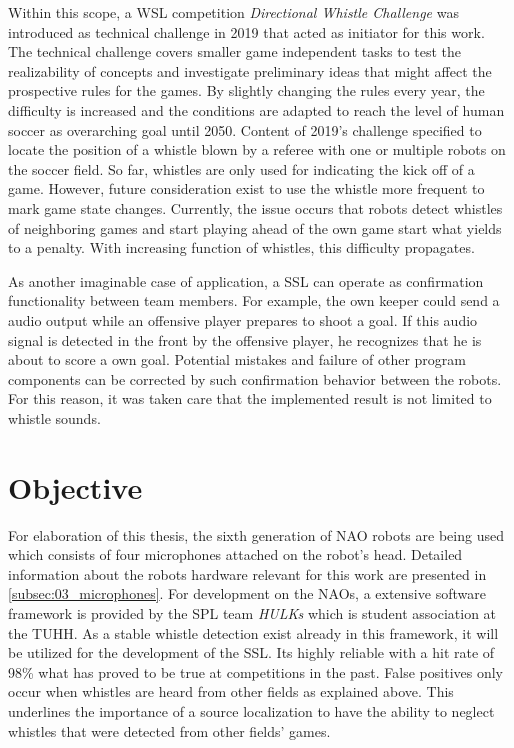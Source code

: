 Within this scope, a \acf{WSL} competition \textit{Directional Whistle Challenge} was
introduced as technical challenge in 2019 that acted as initiator for this work.
The technical challenge covers smaller game independent tasks to test the realizability of
concepts and investigate preliminary ideas that might affect the prospective rules for the games.
By slightly changing the rules every year, the difficulty is increased and the conditions
are adapted to reach the level of human soccer as overarching goal until 2050.
Content of 2019's challenge specified to locate the position of a whistle blown by a referee
with one or multiple robots on the soccer field.
So far, whistles are only used for indicating the kick off of a game.
However, future consideration exist to use the whistle more frequent
to mark game state changes.
Currently, the issue occurs that robots detect whistles of neighboring
games and start playing ahead of the own game start what yields to a penalty.
With increasing function of whistles, this difficulty propagates.

As another imaginable case of application, a \ac{SSL} can operate as confirmation
functionality between team members.
For example, the own keeper could send a audio output while an offensive player prepares
to shoot a goal.
If this audio signal is detected in the front by the offensive player, he recognizes
that he is about to score a own goal.
Potential mistakes and failure of other program components can be corrected by such
confirmation behavior between the robots.
For this reason, it was taken care that the implemented result is not limited to
whistle sounds.

\section{Objective}
\label{sec:01_objective}

For elaboration of this thesis, the sixth generation of NAO robots are being used
which consists of four microphones attached on the robot's head.
Detailed information about the robots hardware relevant for this work are presented
in \cref{subsec:03_microphones}.
For development on the NAOs, a extensive software framework is provided by the
\ac{SPL} team \textit{HULKs} which is student association at the \ac{TUHH}.
As a stable whistle detection exist already in this framework,
it will be utilized for the development of the \ac{SSL}.
Its highly reliable with a hit rate of 98\si{\percent} \cite{Hasselbring} what has proved to be true at
competitions in the past.
False positives only occur when whistles are heard from other fields as explained above.
This underlines the importance of a source localization to have the ability to neglect whistles
that were detected from other fields' games.

